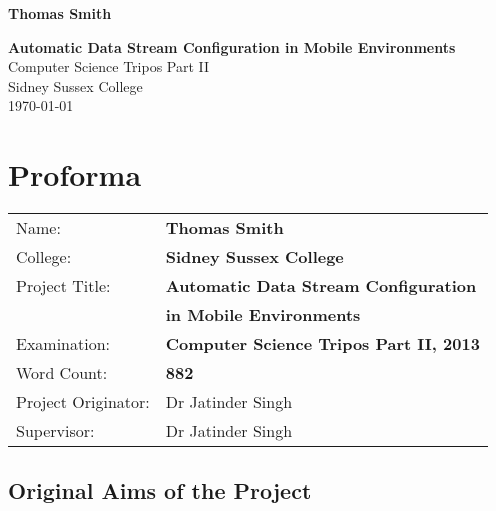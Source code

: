 \documentclass[12pt,twoside,notitlepage]{report}
\begin{document}





\pagestyle{empty}

\hfill{\LARGE \bf Thomas Smith}

\vspace*{60mm}
\begin{center}
\Huge
{\bf Automatic Data Stream Configuration in Mobile Environments} \\
\vspace*{5mm}
Computer Science Tripos Part II \\
\vspace*{5mm}
Sidney Sussex College \\
\vspace*{5mm}
\today  %
\end{center}

\cleardoublepage


\setcounter{page}{1}
\pagestyle{plain}

\chapter*{Proforma}

{\large
\begin{tabular}{ll}
Name:               & \bf Thomas Smith	\\
College:            & \bf Sidney Sussex College	\\
Project Title:      & \bf Automatic Data Stream Configuration \\ &\bf in Mobile Environments	\\
Examination:        & \bf Computer Science Tripos Part II, 2013 	\\
Word Count:         & \bf 882\footnotemark[1] \\
Project Originator: & Dr Jatinder Singh		\\
Supervisor:         & Dr Jatinder Singh		\\ 
\end{tabular}
}



\section*{Original Aims of the Project}
\end{document}
